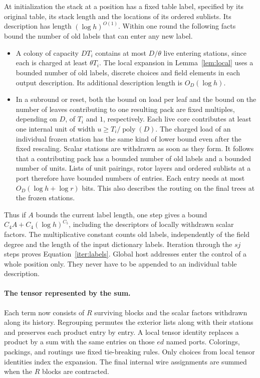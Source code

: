 At initialization the stack at a position has a fixed table label,
specified by its original table, its stack length and the locations
of its ordered sublists. Its description has length
$(\log h)^{O(1)}$. Within one round the following facts bound
the number of old labels that can enter any new label.
\begin{itemize}
\item A colony of capacity $DT_i$ contains at most $D/\theta$ live
entering stations, since each is charged at least $\theta T_i$.
The local expansion in Lemma~\ref{lem:local} uses a bounded number of
old labels, discrete choices and field elements in each output
description. Its additional description length is $O_D(\log h)$.
\item In a subround or reset, both the bound on load per leaf and the
bound on the number of leaves contributing to one resulting pack are
fixed multiples, depending on $D$, of $T_i$ and $1$, respectively.
Each live core contributes at least one internal unit of width
$u\ge T_i/\operatorname{poly}(D)$. The charged load of an individual
frozen station has the same kind of lower bound even after the fixed
rescaling. Scalar stations are withdrawn as soon as they form. It
follows that a contributing pack has a bounded number of old labels
and a bounded number of units. Lists of unit pairings, rotor layers
and ordered sublists at a port therefore have bounded numbers of
entries. Each entry needs at most $O_D(\log h+\log r)$ bits. This
also describes the routing on the final trees at the frozen stations.
\end{itemize}
Thus if $A$ bounds the current label length, one step gives a bound
$C_4A+C_4(\log h)^{C_5}$, including the descriptors of locally
withdrawn scalar factors. The multiplicative constant counts old
labels, independently of the field degree and the length of the input
dictionary labels. Iteration through the $sj$ steps proves
Equation~\eqref{iter:labels}. Global host addresses enter the control
of a whole position only. They never have to be appended to an
individual table description.

\paragraph{The tensor represented by the sum.}
Each term now consists of $R$ surviving blocks and the scalar factors
withdrawn along its history. Regrouping permutes the exterior lists along with their stations and preserves each product entry by entry. A local tensor identity replaces a product by a sum with the same entries on those $ed$ named ports. Colorings, packings, and routings use fixed tie-breaking rules. Only choices from local tensor identities index the expansion.
The final internal wire assignments are summed when the $R$ blocks are
contracted.

